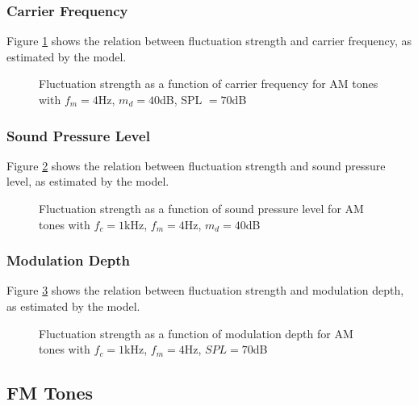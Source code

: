 \documentclass[a4paper]{article}
\begin{document}
\subsubsection{Carrier Frequency}

Figure \ref{fig:AMtonesfcplot} shows the relation between fluctuation strength
and carrier frequency, as estimated by the model.

\begin{figure}[ht]
    \centering
    \resizebox{!}{8cm}{
        
    }
    \caption{Fluctuation strength as a function of carrier frequency for AM
        tones with $f_m = 4 $Hz, $m_d = 40 $dB, SPL $= 70 $dB}
    \label{fig:AMtonesfcplot}
\end{figure}

\subsubsection{Sound Pressure Level}

Figure \ref{fig:AMtonesSPLplot} shows the relation between fluctuation strength
and sound pressure level, as estimated by the model.

\begin{figure}[ht]
    \centering
    \resizebox{!}{8cm}{
        
    }
    \caption{Fluctuation strength as a function of sound pressure level for AM
        tones with $f_c = 1 $kHz, $f_m = 4 $Hz, $m_d = 40 $dB}
    \label{fig:AMtonesSPLplot}
\end{figure}

\subsubsection{Modulation Depth}

Figure \ref{fig:AMtonesmdplot} shows the relation between fluctuation strength
and modulation depth, as estimated by the model.

\begin{figure}[ht]
    \centering
    \resizebox{!}{8cm}{
        
    }
    \caption{Fluctuation strength as a function of modulation depth for AM tones
        with $f_c = 1 $kHz, $f_m = 4 $Hz, $SPL = 70 $dB}
    \label{fig:AMtonesmdplot}
\end{figure}

\subsection{FM Tones}
\end{document}
